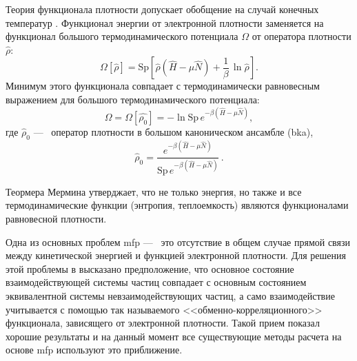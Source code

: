 Теория функционала плотности допускает обобщение на случай конечных температур \cite{mermin:dft-temperatures}.
Функционал энергии от электронной плотности заменяется на функционал большого термодинамического потенциала $\Omega$ от оператора плотности $\hat{\rho}$:
\begin{equation}
    \label{eq:dft:Omega_rho}
    \Omega [\hat{\rho}] = \mathrm{Sp} \left[ \hat{\rho} (\hat{H} - \mu \hat{N}) + \frac{1}{\beta}\, \ln \hat{\rho} \right]. 
\end{equation}
Минимум этого функционала совпадает с термодинамически равновесным выражением для большого термодинамического потенциала:
\begin{equation}
    \label{eq:dft:Omega-min}
    \Omega = \Omega [\hat{\rho_0}] = -\ln \mathrm{Sp}\, e^{-\beta (\hat{H} - \mu \hat{N})}, 
\end{equation}
где $\hat{\rho}_0$ ---~ оператор плотности в большом каноническом ансамбле (\acrshort{bka}),
\begin{equation}
    \label{eq:dft:rho_0-bka}
    \hat{\rho}_0 = \frac{e^{-\beta (\hat{H} - \mu \hat{N})} }{\mathrm{Sp}\, e^{-\beta (\hat{H} - \mu \hat{N})} }\, .
\end{equation}

Теормера Мермина \cite{mermin:dft-temperatures} утверджает, что не только энергия, но также и все термодинамические функции (энтропия, теплоемкость) являются функционалами равновесной плотности.

Одна из основных проблем \acrshort{mfp} ---~ это отсутствие в общем случае прямой связи между кинетической энергией и функцией электронной плотности.
Для решения этой проблемы в \cite{kohn-sham:dft-kinetic-approximation} высказано предположение, что основное состояние взаимодействующей системы частиц совпадает с основным состоянием эквивалентной системы невзаимодействующих частиц, а само взаимодействие учитывается с помощью так называемого <<обменно-корреляционного>> функционала, зависящего от электронной плотности.
Такой прием показал хорошие результаты и на данный момент все существующие методы расчета на основе \acrshort{mfp} используют это приближение.

